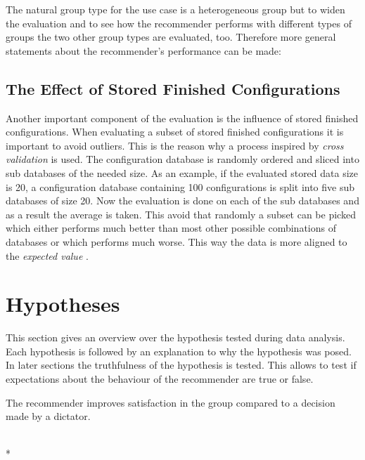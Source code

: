 The natural group type for the use case is a heterogeneous group but to widen the evaluation and to see how the recommender performs with different types of groups the two other group types are evaluated, too. Therefore more general statements about the recommender's performance can be made:

\subsection{The Effect of Stored Finished Configurations}

Another important component of the evaluation is the influence of stored finished configurations. When evaluating a subset of stored finished configurations it is important to avoid outliers. This is the reason why a process inspired by \emph{cross validation}  is used. The configuration database is randomly ordered and sliced into sub databases of the needed size. As an example, if the evaluated stored data size is 20, a configuration database containing 100 configurations is split into five sub databases of size 20. Now the evaluation is done on each of the sub databases and as a result the average is taken. This avoid that randomly a subset can be picked which either performs much better than most other possible combinations of databases or which performs much worse. This way the data is more aligned to the \emph{expected value} .


\section{Hypotheses}
\label{sec:Evaluation:Hypotheses}

This section gives an overview over the hypothesis tested during data analysis. Each hypothesis is followed by an explanation to why the hypothesis was posed. In later sections the truthfulness of the hypothesis is tested. This allows to test if expectations about the behaviour of the recommender are true or false.

\begin{hypothesis}
    \begin{itshape}
        The recommender improves satisfaction in the group compared to a decision made by a dictator.
    \end{itshape} \medskip \\* 
    
\end{hypothesis}

